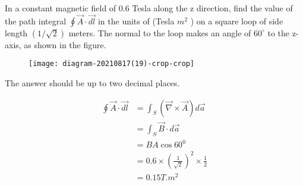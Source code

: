 \begin{enumerate}
	\begin{minipage}{\textwidth}
		\item In a constant magnetic field of $0.6$ Tesla along the $\mathrm{z}$ direction, find the value of the path integral $\oint \vec{A} \cdot \overrightarrow{d l}$ in the units of (Tesla $m^{2}$ ) on a square loop of side length $(1 / \sqrt{2})$ meters. The normal to the loop makes an angle of $60^{\circ}$ to the z-axis, as shown in the figure.\\
		\begin{figure}[H]
			\centering
			\texttt{[image: diagram-20210817(19)-crop-crop]}
		\end{figure}	
		The answer should be up to two decimal places.
	\end{minipage}
	\begin{answer}	
		\begin{align*}
		\oint \vec{A} \cdot \overrightarrow{d l}&=\int_{S}(\vec{\nabla} \times \vec{A}) d \vec{a}\\&=\int_{S} \vec{B} \cdot d \vec{a}\\&=B A \cos 60^{0}\\&=0.6 \times\left(\frac{1}{\sqrt{2}}\right)^{2} \times \frac{1}{2}\\&=0.15 T . m^{2}
		\end{align*}
		

\end{answer}
\end{enumerate}

